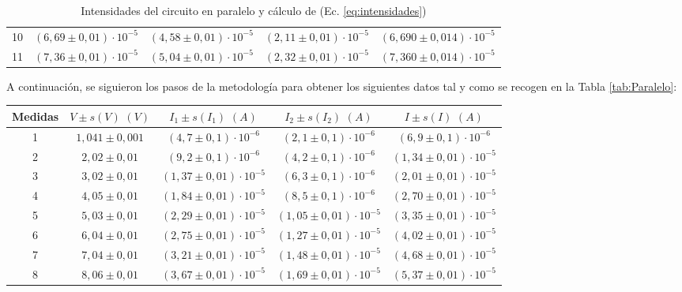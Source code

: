 \documentclass[11pt]{report}
\begin{document}
\begin{refsection}
\begin{table}[H]
\begin{tabular}{|c|c|c|c|c|}
10 & $(6,69 \pm 0,01) \cdot 10^{-5}$ & $(4,58 \pm 0,01) \cdot 10^{-5}$ & $(2,11 \pm 0,01) \cdot 10^{-5}$ & $(6,690 \pm 0,014) \cdot 10^{-5}$\\
11 & $(7,36 \pm 0,01) \cdot 10^{-5}$ & $(5,04 \pm 0,01) \cdot 10^{-5}$ & $(2,32 \pm 0,01) \cdot 10^{-5}$ & $(7,360 \pm 0,014) \cdot 10^{-5}$\\
\hline
\end{tabular}
\caption{Intensidades del circuito en paralelo y cálculo de (Ec. \ref{eq:intensidades})}
\label{tab:intensidades}
\end{table}

A continuación, se siguieron los pasos de la metodología para obtener los siguientes datos tal y como se recogen en la Tabla \ref{tab:Paralelo}:

\begin{table}[H]
\centering
\begin{tabular}{|c|c|c|c|c|}
\hline
Medidas & $V \pm s(V)\hspace{4pt}(V)$ & $I_1 \pm s(I_1)\hspace{4pt}(A)$ & $I_2 \pm s(I_2)\hspace{4pt}(A)$ & $I \pm s(I)\hspace{4pt}(A)$ \\
\hline
1 & $1,041 \pm 0,001$ & $(4,7 \pm 0,1) \cdot 10^{-6}$ & $(2,1 \pm 0,1) \cdot 10^{-6}$ & $(6,9 \pm 0,1) \cdot 10^{-6}$ \\
2 & $2,02 \pm 0,01$ & $(9,2 \pm 0,1) \cdot 10^{-6}$ & $(4,2 \pm 0,1) \cdot 10^{-6}$ & $(1,34 \pm 0,01) \cdot 10^{-5}$ \\
3 & $3,02 \pm 0,01$ & $(1,37 \pm 0,01) \cdot 10^{-5}$ & $(6,3 \pm 0,1) \cdot 10^{-6}$ & $(2,01 \pm 0,01) \cdot 10^{-5}$ \\
4 & $4,05 \pm 0,01$ & $(1,84 \pm 0,01) \cdot 10^{-5}$ & $(8,5 \pm 0,1) \cdot 10^{-6}$ & $(2,70 \pm 0,01) \cdot 10^{-5}$ \\
5 & $5,03 \pm 0,01$ & $(2,29 \pm 0,01) \cdot 10^{-5}$ & $(1,05 \pm 0,01) \cdot 10^{-5}$ & $(3,35 \pm 0,01) \cdot 10^{-5}$ \\
6 & $6,04 \pm 0,01$ & $(2,75 \pm 0,01) \cdot 10^{-5}$ & $(1,27 \pm 0,01) \cdot 10^{-5}$ & $(4,02 \pm 0,01) \cdot 10^{-5}$ \\
7 & $7,04 \pm 0,01$ & $(3,21 \pm 0,01) \cdot 10^{-5}$ & $(1,48 \pm 0,01) \cdot 10^{-5}$ & $(4,68 \pm 0,01) \cdot 10^{-5}$ \\
8 & $8,06 \pm 0,01$ & $(3,67 \pm 0,01) \cdot 10^{-5}$ & $(1,69 \pm 0,01) \cdot 10^{-5}$ & $(5,37 \pm 0,01) \cdot 10^{-5}$ \\

\end{tabular}
\end{table}
\end{refsection}
\end{document}
